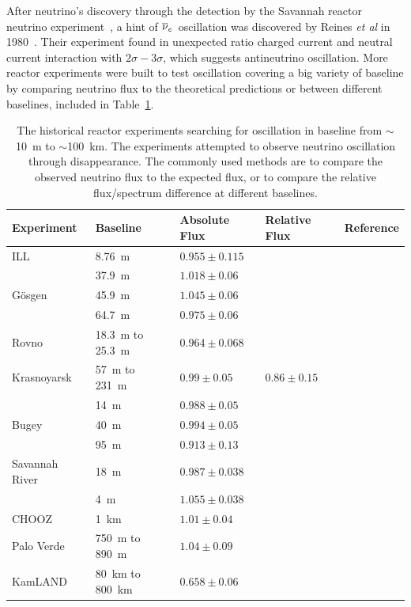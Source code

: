     After neutrino's discovery through the detection by the Savannah reactor neutrino experiment~\cite{bib:CowanReines},
    a hint of $\overline{\nu }_{e}\hspace{1pt}$ oscillation was discovered by Reines \textit{et al} in 1980~\cite{bib:reines1980}.
    Their experiment found in unexpected ratio charged current and neutral current interaction with $2\sigma-3\sigma$, which suggests antineutrino oscillation.
    More reactor experiments were built to test \nuebar oscillation covering a big variety of baseline by comparing neutrino flux to the theoretical predictions or between different baselines, included in Table~\ref{tab:history}.
    \begin{table}[h]
    \centering
    \begin{tabular}{lllll}
    \hline
    Experiment  & Baseline   & Absolute Flux  & Relative Flux    & Reference   \\ 
    \hline
    ILL     & 8.76~m  & $0.955\pm 0.115$  &  & \cite{bib:kwon1981}  \\
    \hline
        & 37.9~m   & $1.018\pm 0.06$  &   &   \\
    G\"osgen  & 45.9~m  & $1.045\pm 0.06$  &   & \cite{bib:gosgen}  \\
        & 64.7~m    & $0.975\pm 0.06$  &   &   \\
    \hline
    Rovno     & 18.3~m to 25.3~m     & $0.964\pm 0.068$  &   & \cite{bib:Afonin1987}  \\
    \hline
    Krasnoyarsk     &  57~m to 231~m    & $0.99\pm 0.05$  & $0.86\pm 0.15$  &  \cite{bib:Vidyakin1994} \\
    \hline
        & 14~m & $0.988\pm 0.05$  &   &   \\
    Bugey   & 40~m  & $0.994\pm 0.05$  &   &  \cite{bib:Bugey} \\
        & 95~m  & $0.913\pm 0.13$  &   &   \\
    \hline
    Savannah River  &  18~m & $0.987\pm 0.038$ &    & \cite{bib:Greenwood1996} \\
        &4~m    & $1.055\pm 0.038$  &   &   \\
    \hline
    CHOOZ   & 1~km     & $1.01\pm 0.04$   &   & \cite{bib:chooz98, bib:Chooz99, bib:chooz03}  \\
    \hline
    Palo Verde   &  750~m to 890~m & $1.04\pm 0.09$ &   &  \cite{bib:palo01, bib:palo1999, bib:palo2000} \\
    \hline
    KamLAND & 80~km to 800~km  &  $0.658\pm 0.06$ &   & \cite{bib:kamland02, bib:kamland04}  \\
    \hline
    \end{tabular}
    \caption[Historical reactor oscillation experiments]{The historical reactor experiments searching for \nuebar oscillation in baseline from $\sim$10~m to $\sim$100~km.
    The experiments attempted to observe neutrino oscillation through \nuebar disappearance.
    The commonly used methods are to compare the observed neutrino flux to the expected flux, or to compare the relative flux/spectrum difference at different baselines.}
    \label{tab:history}
    \end{table}
 

